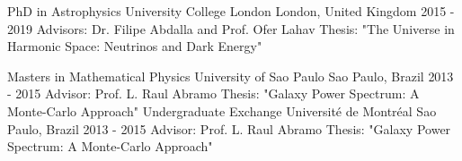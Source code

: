 

\begin{cventries}

 \cventry
    {PhD in Astrophysics} %
    {University College London} %
    {London, United Kingdom} %
    {2015 - 2019} %
    {
    Advisors: Dr. Filipe Abdalla and Prof. Ofer Lahav \linebreak
    Thesis: "The Universe in Harmonic Space: Neutrinos and Dark Energy"
    }
    
\cventry
    {Masters in Mathematical Physics} %
    {University of Sao Paulo} %
    {Sao Paulo, Brazil} %
    {2013 - 2015} %
    {
    Advisor: Prof. L. Raul Abramo \linebreak
    Thesis: "Galaxy Power Spectrum: A Monte-Carlo Approach" 
    }
\cventry
    {Undergraduate Exchange} %
    {Universit\'{e} de Montr\'{e}al} %
    {Sao Paulo, Brazil} %
    {2013 - 2015} %
    {
    Advisor: Prof. L. Raul Abramo \linebreak
    Thesis: "Galaxy Power Spectrum: A Monte-Carlo Approach" 
    }
\vspace{-0.7cm}
\end{cventries}
